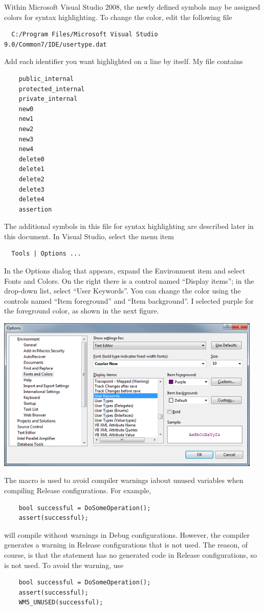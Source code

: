 \documentclass{article}
\begin{document}
Within Microsoft Visual Studio 2008, the newly defined symbols may be assigned
colors for syntax highlighting.  To change the color, edit the following file
\begin{verbatim}
  C:/Program Files/Microsoft Visual Studio 9.0/Common7/IDE/usertype.dat
\end{verbatim}
Add each identifier you want highlighted on a line by itself.  My file
contains
\begin{verbatim}
    public_internal
    protected_internal
    private_internal
    new0
    new1
    new2
    new3
    new4
    delete0
    delete1
    delete2
    delete3
    delete4
    assertion
\end{verbatim}
The additional symbols in this file for syntax highlighting are described
later in this document.  In Visual Studio, select the menu item
\begin{verbatim}
  Tools | Options ...
\end{verbatim}
In the Options dialog that appears, expand the Environment item and
select Fonts and Colors.  On the right there is a control named
``Display items''; in the drop-down list, select ``User Keywords''.
You can change the color using the controls named ``Item foreground''
and ``Item background''. I selected purple for the foreground color,
as shown in the next figure.
\begin{center}
  \includegraphics[width=5in]{OptionsDialog.png}
\end{center}

The macro  is used to avoid compiler warnings
iabout unused variables when compiling Release configurations.  For example,
\begin{verbatim}
    bool successful = DoSomeOperation();
    assert(successful);
\end{verbatim}
will compile without warnings in Debug configurations.  However, the
compiler generates a warning in Release configurations that 
is not used.  The reason, of course, is that the  statement has
no generated code in Release configurations, so  is not used.
To avoid the warning, use
\begin{verbatim}
    bool successful = DoSomeOperation();
    assert(successful);
    WM5_UNUSED(successful);
\end{verbatim}
\end{document}

